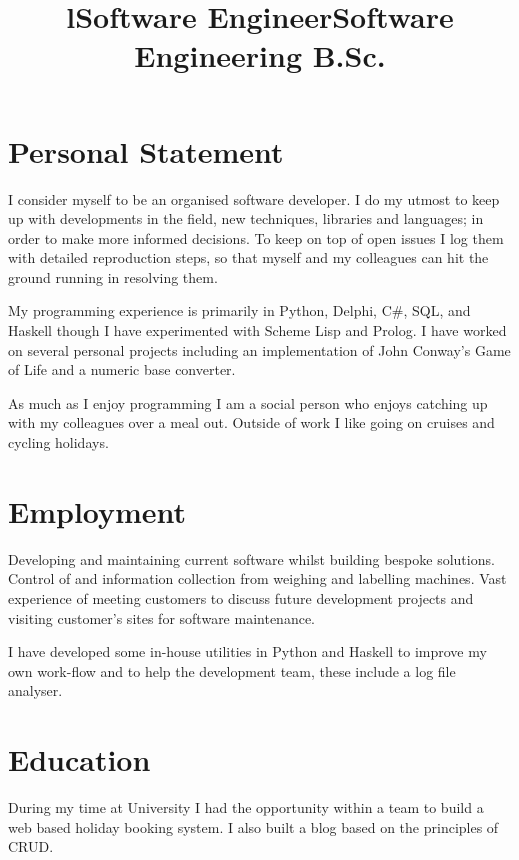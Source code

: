 \documentclass[line,margin]{res}
\title{l} \location{r} \\
\newcommand{\CSharp}{C\#}
\begin{document}
\begin{resume}

\section{Personal Statement}
I consider myself to be an organised software developer.
I do my utmost to keep up with developments in the field, new techniques, libraries and languages; in order to make more informed decisions.
To keep on top of open issues I log them with detailed reproduction steps, so that myself and my colleagues can hit the ground running in resolving them.

My programming experience is primarily in Python, Delphi, {\CSharp}, SQL, and Haskell though I have experimented with Scheme Lisp and Prolog.
I have worked on several personal projects including an implementation of John Conway's Game of Life and a numeric base converter.

As much as I enjoy programming I am a social person who enjoys catching up with my colleagues over a meal out.
Outside of work I like going on cruises and cycling holidays.

\section{Employment}

\title{Software Engineer}
\begin{position}
Developing and maintaining current software whilst building bespoke solutions.
Control of and information collection from weighing and labelling machines.
Vast experience of meeting customers to discuss future development projects and visiting customer's sites for software maintenance.

I have developed some in-house utilities in Python and Haskell to improve my own work-flow and to help the development team, these include a log file analyser.
\end{position}

\section{Education}

\title{Software Engineering B.Sc.} %
\begin{position}
During my time at University I had the opportunity within a team to build a web based holiday booking system.
I also built a blog based on the principles of CRUD.


\end{position}
\end{resume}
\end{document}
